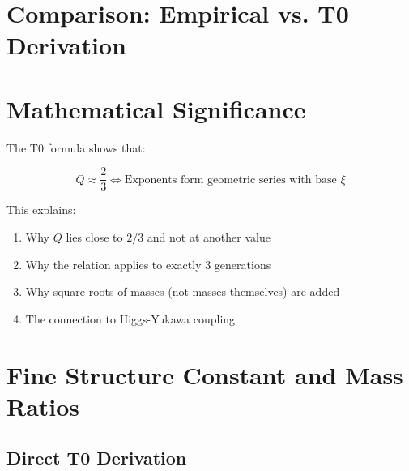 	\section{Comparison: Empirical vs. T0 Derivation}
	
	\begin{table}[h]
		\centering
		\caption{Comparison of Approaches}
	\end{table}
	
	\section{Mathematical Significance}
	
	The T0 formula shows that:
	
	\begin{equation}
		Q \approx \frac{2}{3} \iff \text{Exponents form geometric series with base } \xi
	\end{equation}
	
	This explains:
	\begin{enumerate}
		\item Why $Q$ lies close to $2/3$ and not at another value
		\item Why the relation applies to exactly 3 generations
		\item Why square roots of masses (not masses themselves) are added
		\item The connection to Higgs-Yukawa coupling
	\end{enumerate}
	
	\section{Fine Structure Constant and Mass Ratios}
	
	\subsection{Direct T0 Derivation}
	
